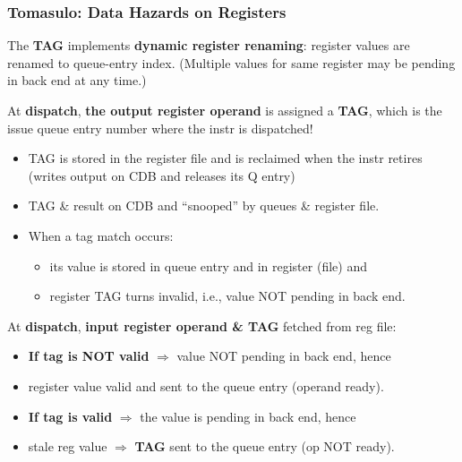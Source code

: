 \documentclass{beamer}
\newcommand{\emp}[1]{\textcolor{DikuRed}{ #1}}
\newcommand{\emphh}[1]{\textcolor{CosGreen}{ #1}}
\begin{document}
\begin{frame}[fragile,t]
\frametitle{Tomasulo: Data Hazards on Registers}
The \emphh{\bf TAG} implements \alert{\bf dynamic register renaming}: 
register values are renamed to queue-entry index. 
(Multiple values for same register may be pending in back end at any time.)\medskip


At \emp{\bf dispatch}, \emphh{\bf the output register operand} is assigned a 
\emphh{\bf TAG}, which is the issue queue entry number where the instr is dispatched!
\begin{itemize}
    \item TAG is stored in the register file and is reclaimed
            when the instr retires (writes output on CDB and releases its Q entry)
    \item TAG \& result on CDB and ``snooped'' by queues \& register file.
    \item When a tag match occurs: 
            \begin{itemize}
                \item its value is stored in queue entry and in register (file) and 
                \item register TAG turns invalid, 
                        i.e., value NOT pending in back end.
            \end{itemize} 
\end  {itemize}
\medskip

At \emp{\bf dispatch}, \emphh{\bf input register operand \& TAG} fetched from reg file:
\begin{itemize}
    \item \emp{\bf If tag is NOT valid} $\Rightarrow$ value NOT pending in back end, hence
    \item register value valid and sent to the queue entry 
            (operand ready).\smallskip
    \item \emp{\bf If tag is valid} $\Rightarrow$ the value is pending in back end, hence
    \item stale reg value $\Rightarrow$ \emphh{\bf TAG} sent to the queue entry
            (op NOT ready).
\end  {itemize}
\end{frame}
\end{document}
